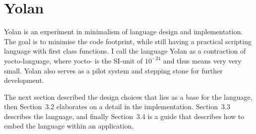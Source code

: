 \documentclass[11pt]{report}
\begin{document}
%
%
%
%
\chapter{Yolan}
\label{yolan}
Yolan is an experiment in minimalism of language design and implementation. 
The goal is to minimise the code footprint, while still having a practical scripting language with first class functions.
I call the language Yolan as a contraction of yocto-language, where yocto- is the SI-unit of $10^{-24}$ and thus means very very small.
Yolan also serves as a pilot system and stepping stone for further development.

The next section described the design choices that lies as a base for the language, then Section~3.2 elaborates on a detail in the implementation. Section~3.3 describes the language, and finally Section~3.4 is a guide that describes how to embed the language within an application.
\end{document}
